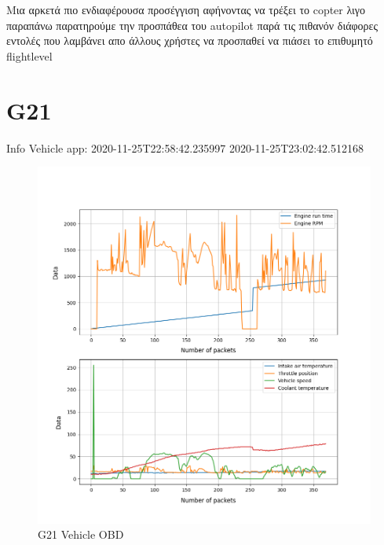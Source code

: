\documentclass[hidelinks, 12pt, a4paper]{article}
\begin{document}
Μια αρκετά πιο ενδιαφέρουσα προσέγγιση αφήνοντας να τρέξει το copter λιγο παραπάνω παρατηρούμε την προσπάθεα του autopilot παρά τις πιθανόν διάφορες εντολές που λαμβάνει απο άλλους χρήστες να προσπαθεί να πιάσει το επιθυμητό flightlevel

\section{G21}

Info Vehicle app:
2020-11-25T22:58:42.235997
2020-11-25T23:02:42.512168

\begin{figure}[h!]
\centering
	\includegraphics[height=.5\textheight, width=\textwidth]{assets/session1/g21.png}
    \caption{G21 Vehicle OBD}
\end{figure}
\end{document}
